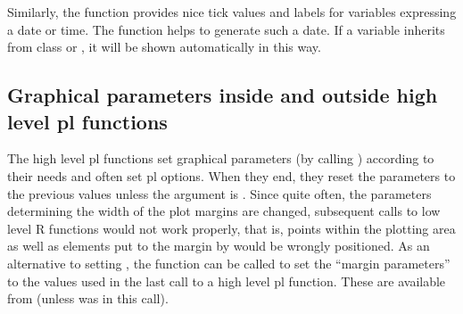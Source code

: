 \documentclass[11pt]{article}\usepackage[]{graphicx}\usepackage[]{color}
\begin{document}
\label{options.dateaxis}
Similarly, the function  provides nice tick values and labels 
for variables expressing a date or time. 
The function  helps to generate such a date. 
If a variable inherits from class  or , it will be shown
automatically in this way.

\subsection{Graphical parameters inside and outside high level pl functions}
The high level pl functions set graphical parameters (by calling ) 
according to their needs and often set pl options. 
When they end, they reset the  parameters to the previous values
unless the argument  is .
Since quite often, the parameters determining the width of the plot margins are
changed, subsequent calls to low level R functions would not work properly,
that is, points within the plotting area as well as elements put to the 
margin by  would be wrongly positioned.
As an alternative to setting , the function 
can be called to set the ``margin parameters'' 
to the values used in the last call to a high level pl function.
These are available from  
(unless  was  in this call).
\end{document}
